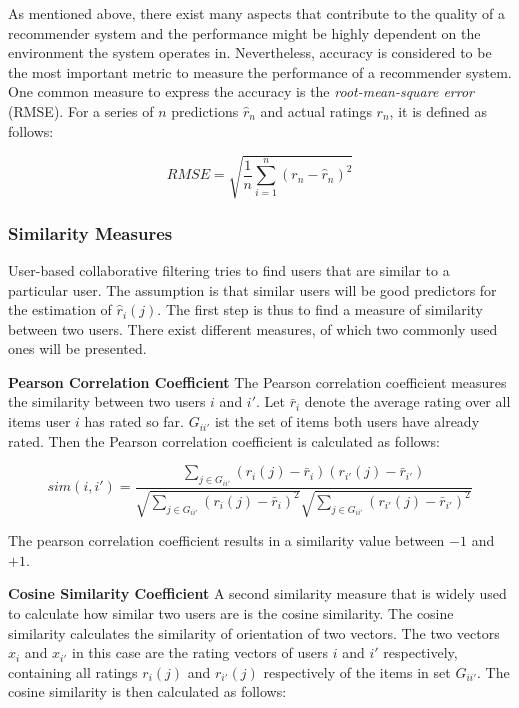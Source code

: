 As mentioned above, there exist many aspects that contribute to the quality of a recommender system and the performance might be highly dependent on the environment the system operates in. Nevertheless, accuracy is considered to be the most important metric to measure the performance of a recommender system. One common measure to express the accuracy is the \textit{root-mean-square error} (RMSE). For a series of $n$ predictions $\hat{r}_n$ and actual ratings $r_n$, it is defined as follows:

\begin{equation}
RMSE = \sqrt{\frac{1}{n} \sum_{i=1}^{n}(r_n - \hat{r}_n)^2}
\label{eq:rmse}
\end{equation}

\subsubsection{Similarity Measures}
\label{ssst:similaritymeasures} User-based collaborative filtering tries to find users that are similar to a particular user. The assumption is that similar users will be good predictors for the estimation of $\hat{r}_i(j)$. The first step is thus to find a measure of similarity between two users. There exist different measures, of which two commonly used ones will be presented.
\newline

\textbf{Pearson Correlation Coefficient} The Pearson correlation coefficient measures the similarity between two users $i$ and $i'$. Let $\bar{r}_i$ denote the average rating over all items user $i$ has rated so far. $G_{ii'}$ ist the set of items both users have already rated. Then the Pearson correlation coefficient is calculated as follows:

\begin{equation}
sim(i,i') = \frac{\sum_{j \in G_{ii'}}{(r_i(j)-\bar{r}_i)(r_{i'}(j)-\bar{r}_{i'})}}{\sqrt{\sum_{j \in G_{ii'}}{(r_i(j)-\bar{r}_i)^2}}\sqrt{\sum_{j \in G_{ii'}}{(r_{i'}(j)-\bar{r}_{i'})^2}}}
\label{eq:pearson}
\end{equation}

The pearson correlation coefficient results in a similarity value between $-1$ and $+1$.
\newline

\textbf{Cosine Similarity Coefficient} A second similarity measure that is widely used to calculate how similar two users are is the cosine similarity. The cosine similarity calculates the similarity of orientation of two vectors. The two vectors $x_i$ and $x_{i'}$ in this case are the rating vectors of users $i$ and $i'$ respectively, containing all ratings $r_{i}(j)$ and $r_{i'}(j)$ respectively of the items in set $G_{ii'}$. The cosine similarity is then calculated as follows:

